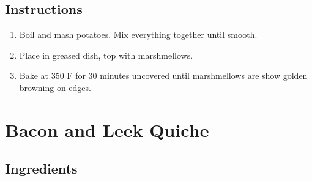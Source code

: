 \documentclass[ansiapaper,10pt,english]{sphinxmanual}
\begin{document}
\section{Instructions}
\label{\detokenize{Sweet_PS:instructions}}\begin{enumerate}
\item {} 
Boil and mash potatoes. Mix everything together until smooth.

\item {} 
Place in greased dish, top with marshmellows.

\item {} 
Bake at 350 F for 30 minutes uncovered until marshmellows are show golden browning on edges.

\end{enumerate}


\chapter{Bacon and Leek Quiche}
\label{\detokenize{Bacon_Leek_Quiche:bacon-and-leek-quiche}}\label{\detokenize{Bacon_Leek_Quiche::doc}}

\section{Ingredients}
\label{\detokenize{Bacon_Leek_Quiche:ingredients}}
%
\begin{sphinxVerbatim}[commandchars=\\\{\}]
        

    

   

       

      

 

    

  
\end{sphinxVerbatim}
\end{document}
